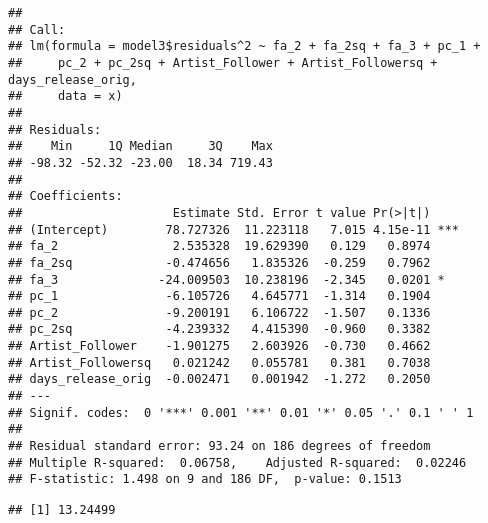\documentclass[
]{article}
\newenvironment{Shaded}{\begin{snugshade}}{\end{snugshade}}
\newcommand{\CommentTok}[1]{\textcolor[rgb]{0.56,0.35,0.01}{\textit{#1}}}
\newcommand{\DataTypeTok}[1]{\textcolor[rgb]{0.13,0.29,0.53}{#1}}
\newcommand{\DecValTok}[1]{\textcolor[rgb]{0.00,0.00,0.81}{#1}}
\newcommand{\KeywordTok}[1]{\textcolor[rgb]{0.13,0.29,0.53}{\textbf{#1}}}
\newcommand{\NormalTok}[1]{#1}
\newcommand{\OperatorTok}[1]{\textcolor[rgb]{0.81,0.36,0.00}{\textbf{#1}}}
\newcommand{\StringTok}[1]{\textcolor[rgb]{0.31,0.60,0.02}{#1}}
\begin{document}
\begin{verbatim}
## 
## Call:
## lm(formula = model3$residuals^2 ~ fa_2 + fa_2sq + fa_3 + pc_1 + 
##     pc_2 + pc_2sq + Artist_Follower + Artist_Followersq + days_release_orig, 
##     data = x)
## 
## Residuals:
##    Min     1Q Median     3Q    Max 
## -98.32 -52.32 -23.00  18.34 719.43 
## 
## Coefficients:
##                     Estimate Std. Error t value Pr(>|t|)    
## (Intercept)        78.727326  11.223118   7.015 4.15e-11 ***
## fa_2                2.535328  19.629390   0.129   0.8974    
## fa_2sq             -0.474656   1.835326  -0.259   0.7962    
## fa_3              -24.009503  10.238196  -2.345   0.0201 *  
## pc_1               -6.105726   4.645771  -1.314   0.1904    
## pc_2               -9.200191   6.106722  -1.507   0.1336    
## pc_2sq             -4.239332   4.415390  -0.960   0.3382    
## Artist_Follower    -1.901275   2.603926  -0.730   0.4662    
## Artist_Followersq   0.021242   0.055781   0.381   0.7038    
## days_release_orig  -0.002471   0.001942  -1.272   0.2050    
## ---
## Signif. codes:  0 '***' 0.001 '**' 0.01 '*' 0.05 '.' 0.1 ' ' 1
## 
## Residual standard error: 93.24 on 186 degrees of freedom
## Multiple R-squared:  0.06758,    Adjusted R-squared:  0.02246 
## F-statistic: 1.498 on 9 and 186 DF,  p-value: 0.1513
\end{verbatim}

\begin{Shaded}
\end{Shaded}

\begin{verbatim}
## [1] 13.24499
\end{verbatim}

\begin{Shaded}
\end{Shaded}
\end{document}
